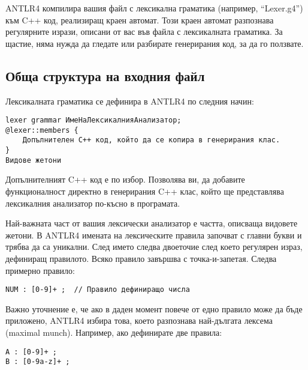 \documentclass[11pt]{article}
\makeatletter
\newcommand{\verbatimfont}[1]{\def\verbatim@font{#1}}%
\makeatother
\begin{document}
ANTLR4 компилира вашия файл с лексикална граматика (например, ``Lexer.g4'') към C++ код, реализиращ краен автомат.
Този краен автомат разпознава регулярните изрази, описани от вас във файла с лексикалната граматика.
За щастие, няма нужда да гледате или разбирате генерирания код, за да го ползвате.

\subsection{Обща структура на входния файл}

Лексикалната граматика се дефинира в ANTLR4 по следния начин:

\verbatimfont{\CyrMono}
\begin{verbatim}
lexer grammar ИмеНаЛексикалнияАнализатор;
@lexer::members {
    Допълнителен C++ код, който да се копира в генерирания клас.
}
Видове жетони
\end{verbatim}

Допълнителният C++ код е по избор.
Позволява ви, да добавите функционалност директно в генерирания C++ клас, който ще представлява лексикалния анализатор по-късно в програмата.

Най-важната част от вашия лексически анализатор е частта, описваща видовете жетони.
В ANTLR4 имената на лексическите правила започват с главни букви и трябва да са уникални.
След името следва двоеточие след което регулярен израз, дефиниращ правилото.
Всяко правило завършва с точка-и-запетая. Следва примерно правило:

\begin{verbatim}
NUM : [0-9]+ ;  // Правило дефиниращо числа
\end{verbatim}

Важно уточнение е, че ако в даден момент повече от едно правило може да бъде приложено, ANTLR4 избира това, което разпознава най-дългата лексема (maximal munch).
Например, ако дефинирате две правила:

\begin{verbatim}
A : [0-9]+ ;
B : [0-9a-z]+ ;
\end{verbatim}
\end{document}
